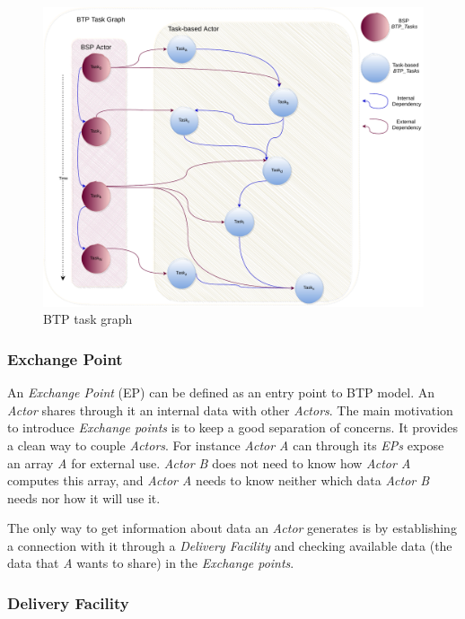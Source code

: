 \begin{figure}[tb]\centering
\includegraphics[width=0.75\columnwidth]{figures/BTPTaskGraph.pdf}
\caption{BTP task graph}
\label{figWUG}
\end{figure}

\subsubsection{Exchange Point}\label{EP}

An \textit{Exchange Point} (EP) can be defined as an entry point to BTP model. An \textit{Actor} shares through it an internal data with other \textit{Actors}. The main motivation to introduce \textit{Exchange points} is to keep a good separation of concerns. It provides a clean way to couple \textit{Actors}. For instance \textit{Actor A} can through its \textit{EPs} expose an array \textit{A} for external use. \textit{Actor B} does not need to know how \textit{Actor A} computes this array, and \textit{Actor A} needs to know neither which data \textit{Actor B} needs nor how it will use it.

The only way to get information about data an \textit{Actor} generates is by establishing a connection with it through a \textit{Delivery Facility} and checking available data (the data that \textit{A} wants to share) in the \textit{Exchange points}.


\subsubsection{Delivery Facility}\label{DF}

